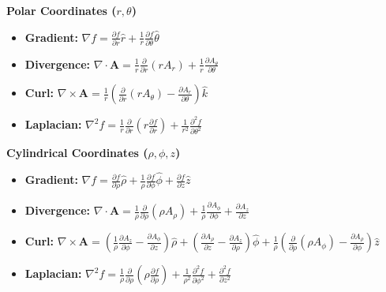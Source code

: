 \documentclass[10pt, landscape, twocolumn]{article}
\newcommand{\cheatsheetsubsection}[1]{
    \vspace{0.5em}
    {\color{themeblue}\normalsize\bfseries #1} \par
    \vspace{0.2em}
}
\begin{document}
\cheatsheetsubsection{Polar Coordinates ($r, \theta$)}
\begin{itemize}[leftmargin=*, nosep]
    \item \textbf{Gradient:} $\nabla f = \frac{\partial f}{\partial r}\hat{r} + \frac{1}{r}\frac{\partial f}{\partial \theta}\hat{\theta}$
    \item \textbf{Divergence:} $\nabla \cdot \mathbf{A} = \frac{1}{r}\frac{\partial}{\partial r}(r A_r) + \frac{1}{r}\frac{\partial A_\theta}{\partial \theta}$
    \item \textbf{Curl:} $\nabla \times \mathbf{A} = \frac{1}{r}\left( \frac{\partial}{\partial r}(r A_\theta) - \frac{\partial A_r}{\partial \theta} \right)\hat{k}$
    \item \textbf{Laplacian:} $\nabla^2 f = \frac{1}{r}\frac{\partial}{\partial r}\left(r \frac{\partial f}{\partial r}\right) + \frac{1}{r^2}\frac{\partial^2 f}{\partial \theta^2}$
\end{itemize}

\cheatsheetsubsection{Cylindrical Coordinates ($\rho, \phi, z$)}
\begin{itemize}[leftmargin=*, nosep]
    \item \textbf{Gradient:} $\nabla f = \frac{\partial f}{\partial \rho}\hat{\rho} + \frac{1}{\rho}\frac{\partial f}{\partial \phi}\hat{\phi} + \frac{\partial f}{\partial z}\hat{z}$
    \item \textbf{Divergence:} $\nabla \cdot \mathbf{A} = \frac{1}{\rho}\frac{\partial}{\partial \rho}(\rho A_\rho) + \frac{1}{\rho}\frac{\partial A_\phi}{\partial \phi} + \frac{\partial A_z}{\partial z}$
    \item \textbf{Curl:} $\nabla \times \mathbf{A} = \left( \frac{1}{\rho}\frac{\partial A_z}{\partial \phi} - \frac{\partial A_\phi}{\partial z} \right)\hat{\rho} + \left( \frac{\partial A_\rho}{\partial z} - \frac{\partial A_z}{\partial \rho} \right)\hat{\phi} + \frac{1}{\rho}\left( \frac{\partial}{\partial \rho}(\rho A_\phi) - \frac{\partial A_\rho}{\partial \phi} \right)\hat{z}$
    \item \textbf{Laplacian:} $\nabla^2 f = \frac{1}{\rho}\frac{\partial}{\partial \rho}\left(\rho \frac{\partial f}{\partial \rho}\right) + \frac{1}{\rho^2}\frac{\partial^2 f}{\partial \phi^2} + \frac{\partial^2 f}{\partial z^2}$
\end{itemize}
\end{document}
